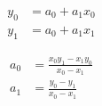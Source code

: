 \begin{align}
  y_0 & = a_0+a_1 x_0  \\
   y_1 & = a_0+a_1 x_1  
\end{align}

 
\begin{align}
  a_0 & = \frac
{x_0 y_1 - x_1 y_0}
{x_0 - x_1} \\
   a_1 & = \frac
{y_0 - y_1}
{x_0 - x_1} 
\end{align}

